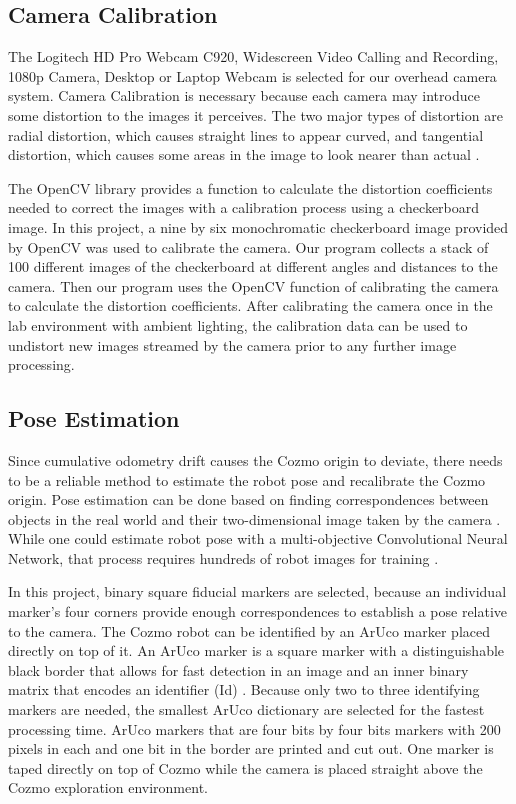 \documentclass[jou,apacite]{apa6}
\begin{document}
\subsection{Camera Calibration}
The Logitech HD Pro Webcam C920, Widescreen Video Calling and Recording, 1080p Camera, Desktop or Laptop Webcam is selected for our overhead camera system. Camera Calibration is necessary because each camera may introduce some distortion to the images it perceives. The two major types of distortion are radial distortion, which causes straight lines to appear curved, and tangential distortion, which causes some areas in the image to look nearer than actual \cite{OpenCV}. 

The OpenCV library provides a function to calculate the distortion coefficients needed to correct the images with a calibration process using a checkerboard image. In this project, a nine by six monochromatic checkerboard image provided by OpenCV was used to calibrate the camera. Our program collects a stack of 100 different images of the checkerboard at different angles and distances to the camera. Then our program uses the OpenCV function of calibrating the camera to calculate the distortion coefficients. 
After calibrating the camera once in the lab environment with ambient lighting, the calibration data can be used to undistort new images streamed by the camera prior to any further image processing.

\subsection{Pose Estimation}
Since cumulative odometry drift causes the Cozmo origin to deviate, there needs to be a reliable method to estimate the robot pose and recalibrate the Cozmo origin. Pose estimation can be done based on finding correspondences between objects in the real world and their two-dimensional image taken by the camera \cite{OpenCV}. While one could estimate robot pose with a multi-objective Convolutional Neural Network, that process requires hundreds of robot images for training \cite{Miseikis}.

In this project, binary square fiducial markers are selected, because an individual marker’s four corners provide enough correspondences to establish a pose relative to the camera. The Cozmo robot can be identified by an ArUco marker placed directly on top of it. An ArUco marker is a square marker with a distinguishable black border that allows for fast detection in an image and an inner binary matrix that encodes an identifier (Id) \cite{Garrido-Jurado}. Because only two to three identifying markers are needed, the smallest ArUco dictionary are selected for the fastest processing time. ArUco markers that are four bits by four bits markers with 200 pixels in each and one bit in the border are printed and cut out. One marker is taped directly on top of Cozmo while the camera is placed straight above the Cozmo exploration environment.
\end{document}
